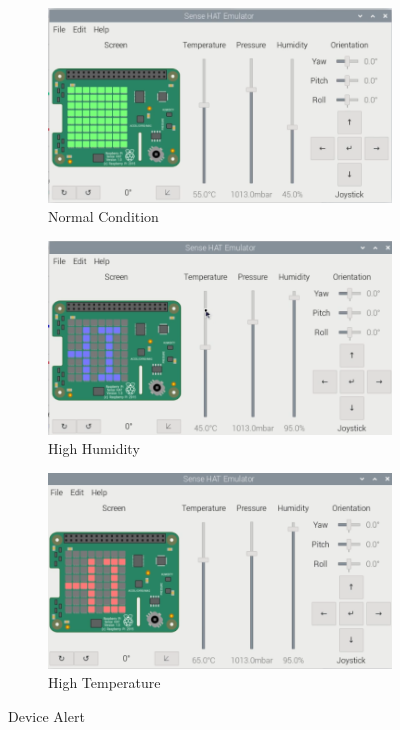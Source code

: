 \documentclass[12pt,a4paper]{article}
\begin{document}
\begin{figure}[h!]
  \centering
  \begin{subfigure}[b]{0.31\textwidth}
      \includegraphics[width=\textwidth]{figures/11.png}
      \caption{Normal Condition}
      \label{fig:sub1}
  \end{subfigure}
  \hfill
  \begin{subfigure}[b]{0.31\textwidth}
      \includegraphics[width=\textwidth]{figures/22.png}
      \caption{High Humidity}
      \label{fig:sub2}
  \end{subfigure}
  \hfill
  \begin{subfigure}[b]{0.31\textwidth}
      \includegraphics[width=\textwidth]{figures/33.png}
      \caption{High Temperature}
      \label{fig:sub3}
  \end{subfigure}
  \caption{Device Alert}
  \label{fig:upload-stages}
\end{figure}
\end{document}
